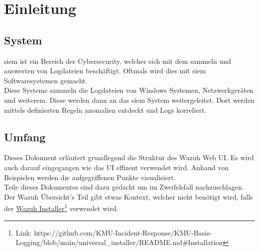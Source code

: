 \chapter{Einleitung}

\section{ System}
\acrfull{siem} ist ein Bereich der Cybersecurity, welcher sich mit dem sammeln und auswerten von Logdateien beschäftigt.
Oftmals wird dies mit \acrshort{siem} Softwaresystemen gemacht.\\

Diese Systeme sammeln die Logdateien von Windows Systemen, Netzwerkgeräten und weiterem.
Diese werden dann an das \acrshort{siem} System weitergeleitet.
Dort werden mittels definierten Regeln anomalien entdeckt und Logs korreliert.

\section{Umfang}
Dieses Dokument erläutert grundlegend die Struktur des Wazuh Web UI.
Es wird auch darauf eingegangen wie das UI effizent verwendet wird.
Anhand von Beispielen werden die aufgegriffenen Punkte visualisiert.\\

Teile dieses Dokumentes sind dazu gedacht um im Zweifelsfall nachzuschlagen.
Der Wazuh Übersicht's Teil gibt etwas Kontext, welcher nicht benötigt wird, falls der \href{https://github.com/KMU-Incident-Response/KMU-Basis-Logging/blob/main/universal\_installer/README.md\#Installation}{Wazuh Installer}\footnote{Link: https://github.com/KMU-Incident-Response/KMU-Basis-Logging/blob/main/universal\_installer/README.md\#Installation} verwendet wird.
